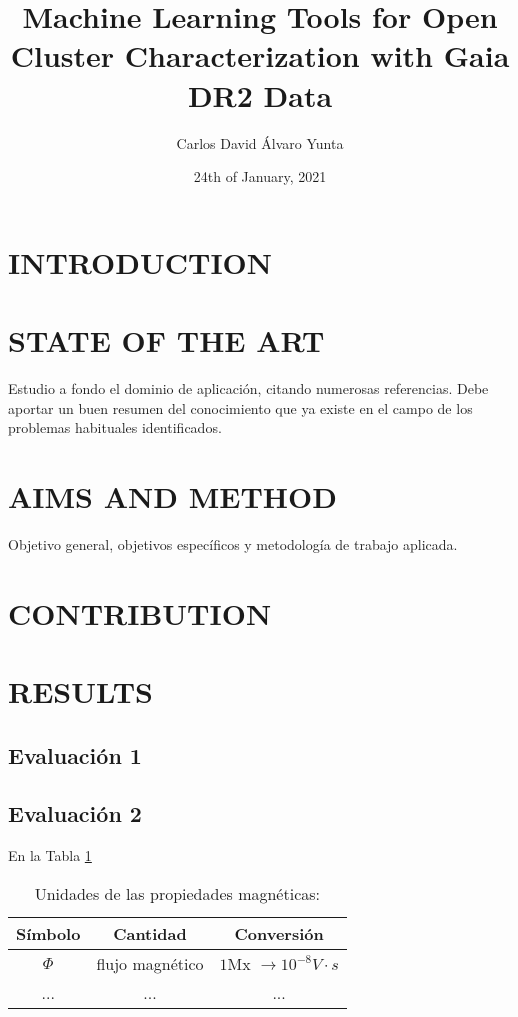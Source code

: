\documentclass[11pt,a4paper,USenglish,twocolumn]{article}
\title{Machine Learning Tools for Open Cluster Characterization with Gaia DR2 Data}
\author{Carlos David Álvaro Yunta}
\date{24th of January, 2021}
\begin{document}
\twocolumn[
\begin{@twocolumnfalse}
\maketitle
\end{@twocolumnfalse}
]




\section{INTRODUCTION}

\section{STATE OF THE ART}

Estudio a fondo el dominio de aplicación, citando numerosas referencias.
Debe aportar un buen resumen del conocimiento que ya existe en el campo de los problemas habituales identificados.
\section{AIMS AND METHOD}

Objetivo general, objetivos específicos y metodología de trabajo aplicada.

\section{CONTRIBUTION}

\section{RESULTS}
\subsection{Evaluación 1}

\subsection{Evaluación 2 }
En la Tabla \ref{tab_1}
\begin{table}\label{tab_1}
\caption{Unidades de las propiedades magnéticas:}

\begin{tabular}{ccc}\hline\hline
Símbolo & Cantidad & Conversión\\
\hline
$\Phi$ & flujo magnético & $1$Mx $\rightarrow 10^{-8}V\cdot s$\\
... &...&...\\
\hline\hline
\end{tabular}
\end{table}
\end{document}
